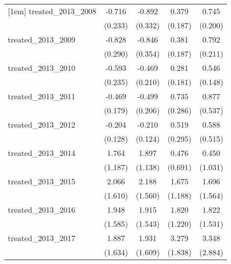 {\begin{tabular}{l*{4}{c}}
[1em]
treated\_2013\_2008&      -0.716\sym{**} &      -0.892\sym{**} &       0.379\sym{*}  &       0.745\sym{***}\\
            &     (0.233)         &     (0.332)         &     (0.187)         &     (0.200)         \\
[1em]
treated\_2013\_2009&      -0.828\sym{**} &      -0.846\sym{*}  &       0.381\sym{*}  &       0.792\sym{***}\\
            &     (0.290)         &     (0.354)         &     (0.187)         &     (0.211)         \\
[1em]
treated\_2013\_2010&      -0.593\sym{*}  &      -0.469\sym{*}  &       0.281         &       0.546\sym{***}\\
            &     (0.235)         &     (0.210)         &     (0.181)         &     (0.148)         \\
[1em]
treated\_2013\_2011&      -0.469\sym{**} &      -0.499\sym{*}  &       0.735\sym{*}  &       0.877         \\
            &     (0.179)         &     (0.206)         &     (0.286)         &     (0.537)         \\
[1em]
treated\_2013\_2012&      -0.204         &      -0.210         &       0.519         &       0.588         \\
            &     (0.128)         &     (0.124)         &     (0.295)         &     (0.515)         \\
[1em]
treated\_2013\_2014&       1.764         &       1.897         &       0.476         &       0.450         \\
            &     (1.187)         &     (1.138)         &     (0.691)         &     (1.031)         \\
[1em]
treated\_2013\_2015&       2.066         &       2.188         &       1.675         &       1.696         \\
            &     (1.610)         &     (1.560)         &     (1.188)         &     (1.564)         \\
[1em]
treated\_2013\_2016&       1.948         &       1.915         &       1.820         &       1.822         \\
            &     (1.585)         &     (1.543)         &     (1.220)         &     (1.531)         \\
[1em]
treated\_2013\_2017&       1.887         &       1.931         &       3.279         &       3.348         \\
            &     (1.634)         &     (1.609)         &     (1.838)         &     (2.884)         \\

\end{tabular}}
